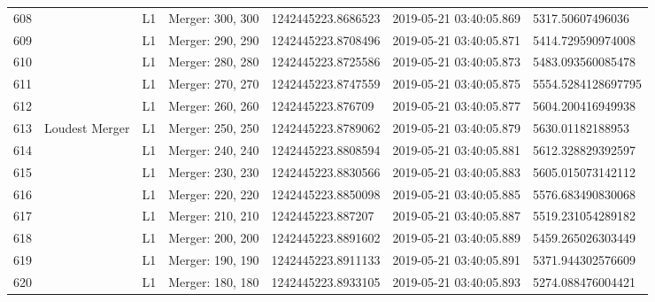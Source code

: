 \begin{longtable}{lllllll}
608  &                                                    &       L1 &  Merger: 300, 300 &  1242445223.8686523 &  2019-05-21 03:40:05.869 &    5317.50607496036 \\
609  &                                                    &       L1 &  Merger: 290, 290 &  1242445223.8708496 &  2019-05-21 03:40:05.871 &   5414.729590974008 \\
610  &                                                    &       L1 &  Merger: 280, 280 &  1242445223.8725586 &  2019-05-21 03:40:05.873 &   5483.093560085478 \\
611  &                                                    &       L1 &  Merger: 270, 270 &  1242445223.8747559 &  2019-05-21 03:40:05.875 &  5554.5284128697795 \\
612  &                                                    &       L1 &  Merger: 260, 260 &   1242445223.876709 &  2019-05-21 03:40:05.877 &   5604.200416949938 \\
613  &                                     Loudest Merger &       L1 &  Merger: 250, 250 &  1242445223.8789062 &  2019-05-21 03:40:05.879 &    5630.01182188953 \\
614  &                                                    &       L1 &  Merger: 240, 240 &  1242445223.8808594 &  2019-05-21 03:40:05.881 &   5612.328829392597 \\
615  &                                                    &       L1 &  Merger: 230, 230 &  1242445223.8830566 &  2019-05-21 03:40:05.883 &   5605.015073142112 \\
616  &                                                    &       L1 &  Merger: 220, 220 &  1242445223.8850098 &  2019-05-21 03:40:05.885 &   5576.683490830068 \\
617  &                                                    &       L1 &  Merger: 210, 210 &   1242445223.887207 &  2019-05-21 03:40:05.887 &   5519.231054289182 \\
618  &                                                    &       L1 &  Merger: 200, 200 &  1242445223.8891602 &  2019-05-21 03:40:05.889 &   5459.265026303449 \\
619  &                                                    &       L1 &  Merger: 190, 190 &  1242445223.8911133 &  2019-05-21 03:40:05.891 &   5371.944302576609 \\
620  &                                                    &       L1 &  Merger: 180, 180 &  1242445223.8933105 &  2019-05-21 03:40:05.893 &   5274.088476004421 \\

\end{longtable}
